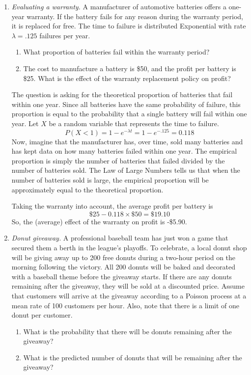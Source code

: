 \begin{enumerate}
\item \emph{Evaluating a warranty.}
  A manufacturer of automotive batteries offers a one-year
  warranty. If the battery fails for any reason during the warranty
  period, it is replaced for free. The time to failure is distributed
  Exponential with rate $\lambda=.125$ failures per year.
\begin{enumerate}
\item What proportion of batteries fail within the warranty period?
\item The cost to manufacture a battery is \$50, and the profit
per battery is \$25. What is the effect of the warranty replacement
policy on profit? \label{ex:profit}
\end{enumerate}

\begin{solution}
  \bs The question is asking for the theoretical proportion of
  batteries that fail within one year. Since all batteries have the
  same probability of failure, this proportion is equal to the
  probability that a single battery will fail within one year. Let $X$
  be a random variable that represents the time to failure.
\[ P(X<1) = 1-e^{-\lambda t} = 1 - e^{-.125} = 0.118 \]
Now, imagine that the manufacturer has, over time,
  sold many batteries and has kept data on how many batteries failed
  within one year. The empirical proportion is simply the number
  of batteries that failed divided by the number of batteries sold.
  The Law of Large Numbers tells us that when the number of batteries
  sold is large, the empirical proportion will be approximately
  equal to the theoretical proportion.

Taking the warranty into account, the average profit per battery is
\[ \$25 - 0.118\times \$50 = \$19.10 \]
So, the (average) effect of the warranty on profit is -\$5.90.
\end{solution}

\item \emph{Donut giveaway.}  A professional baseball team has just
  won a game that secured them a berth in the league’s playoffs. To
  celebrate, a local donut shop will be giving away up to 200 free
  donuts during a two-hour period on the morning following the
  victory. All 200 donuts will be baked and decorated with a baseball
  theme before the giveaway starts. If there are any donuts remaining
  after the giveaway, they will be sold at a discounted price. Assume
  that customers will arrive at the giveaway according to a Poisson
  process at a mean rate of 100 customers per hour. Also, note that
  there is a limit of one donut per customer.
\begin{enumerate}
	\item What is the probability that there will be donuts remaining after the giveaway? \label{ex:donuta}
	\item What is the predicted number of donuts that will be remaining after the giveaway? \label{ex:donutb}
\end{enumerate}


\end{enumerate}
